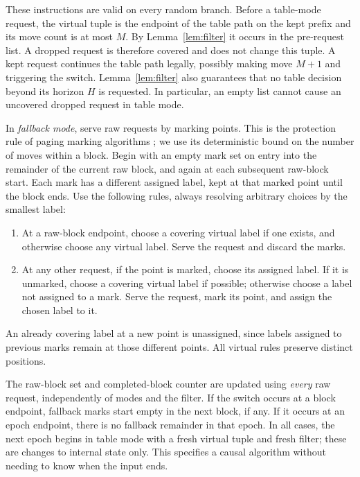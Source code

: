 These instructions are valid on every random branch.  Before a
table-mode request, the virtual tuple is the endpoint of the table path
on the kept prefix and its move count is at most $M$.  By
Lemma~\ref{lem:filter} it occurs in the pre-request list.  A dropped
request is therefore covered and does not change this tuple.  A kept
request continues the table path legally, possibly making move $M+1$
and triggering the switch.  Lemma~\ref{lem:filter} also guarantees that
no table decision beyond its horizon $H$ is requested.  In particular,
an empty list cannot cause an uncovered dropped request in table mode.

In \emph{fallback mode}, serve raw requests by marking points. This is
the protection rule of paging marking algorithms
\cite[Section~3]{FKLMSY1991}; we use its deterministic bound on the number
of moves within a block. Begin
with an empty mark set on entry into the remainder of the current raw
block, and again at each subsequent raw-block start.  Each mark has a
different assigned label, kept at that marked point until the block
ends.  Use the following rules, always resolving arbitrary choices by
the smallest label:
\begin{enumerate}[label=(\roman*),leftmargin=*]
\item At a raw-block endpoint, choose a covering virtual label if one
exists, and otherwise choose any virtual label.  Serve the request and
discard the marks.
\item At any other request, if the point is marked, choose its assigned
label.  If it is unmarked, choose a covering virtual label if possible;
otherwise choose a label not assigned to a mark.  Serve the request,
mark its point, and assign the chosen label to it.
\end{enumerate}
An already covering label at a new point is unassigned, since labels
assigned to previous marks remain at those different points.  All
virtual rules preserve distinct positions.

The raw-block set and completed-block counter are updated using
\emph{every} raw request, independently of modes and the filter.  If
the switch occurs at a block endpoint, fallback marks start empty in
the next block, if any.  If it occurs at an epoch endpoint, there is
no fallback remainder in that epoch.  In all cases, the next epoch
begins in table mode with a fresh virtual tuple and fresh filter;
these are changes to internal state only.  This specifies a causal
algorithm without needing to know when the input ends.

